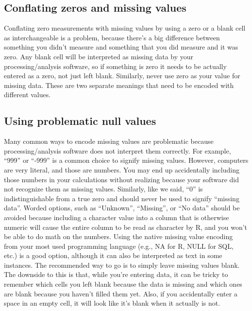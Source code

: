 \documentclass[
]{book}
\begin{document}
\hypertarget{conflating-zeros-and-missing-values}{%
\subsection{Conflating zeros and missing values}\label{conflating-zeros-and-missing-values}}

Conflating zero measurements with missing values by using a zero or a blank cell as interchangeable is a problem, because there's a big difference between something you didn't measure and something that you did measure and it was zero. Any blank cell will be interpreted as missing data by your processing/analysis software, so if something is zero it needs to be actually entered as a zero, not just left blank. Similarly, never use zero as your value for missing data. These are two separate meanings that need to be encoded with different values.

\hypertarget{using-problematic-null-values}{%
\subsection{Using problematic null values}\label{using-problematic-null-values}}

Many common ways to encode missing values are problematic because processing/analysis software does not interpret them correctly. For example, ``999'' or ``-999'' is a common choice to signify missing values. However, computers are very literal, and those are numbers. You may end up accidentally including those numbers in your calculations without realizing because your software did not recognize them as missing values. Similarly, like we said, ``0'' is indistinguishable from a true zero and should never be used to signify ``missing data''. Worded options, such as ``Unknown'', ``Missing'', or ``No data'' should be avoided because including a character value into a column that is otherwise numeric will cause the entire column to be read as character by R, and you won't be able to do math on the numbers. Using the native missing value encoding from your most used programming language (e.g., NA for R, NULL for SQL, etc.) is a good option, although it can also be interpreted as text in some instances. The recommended way to go is to simply leave missing values blank. The downside to this is that, while you're entering data, it can be tricky to remember which cells you left blank because the data is missing and which ones are blank because you haven't filled them yet. Also, if you accidentally enter a space in an empty cell, it will look like it's blank when it actually is not.
\end{document}
